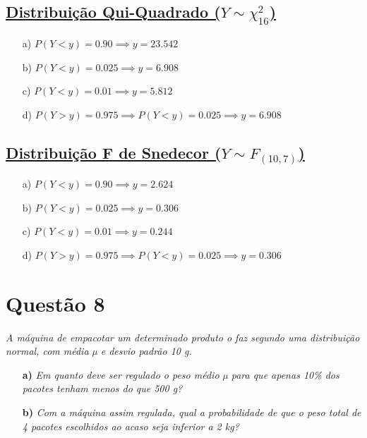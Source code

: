 \documentclass[12pt, a4paper]{article}
\begin{document}
\subsection*{\underline{Distribuição Qui-Quadrado ($Y \sim \chi^2_{16}$)}}
\begin{itemize}
    \item[a)] $P(Y < y) = 0.90 \implies y = \mathbf{23.542}$
    \item[b)] $P(Y < y) = 0.025 \implies y = \mathbf{6.908}$
    \item[c)] $P(Y < y) = 0.01 \implies y = \mathbf{5.812}$
    \item[d)] $P(Y > y) = 0.975 \implies P(Y < y) = 0.025 \implies y = \mathbf{6.908}$
\end{itemize}
\vspace{0.5cm}

\subsection*{\underline{Distribuição F de Snedecor ($Y \sim F_{(10,7)}$)}}
\begin{itemize}
    \item[a)] $P(Y < y) = 0.90 \implies y = \mathbf{2.624}$
    \item[b)] $P(Y < y) = 0.025 \implies y = \mathbf{0.306}$
    \item[c)] $P(Y < y) = 0.01 \implies y = \mathbf{0.244}$
    \item[d)] $P(Y > y) = 0.975 \implies P(Y < y) = 0.025 \implies y = \mathbf{0.306}$
\end{itemize}


\section*{Questão 8}
\textit{A máquina de empacotar um determinado produto o faz segundo uma distribuição normal, com média µ e desvio padrão 10 g.}
\begin{itemize}
    \item[\textbf{a)}] \textit{Em quanto deve ser regulado o peso médio µ para que apenas 10\% dos pacotes tenham menos do que 500 g?}
    \item[\textbf{b)}] \textit{Com a máquina assim regulada, qual a probabilidade de que o peso total de 4 pacotes escolhidos ao acaso seja inferior a 2 kg?}
\end{itemize}
\end{document}
